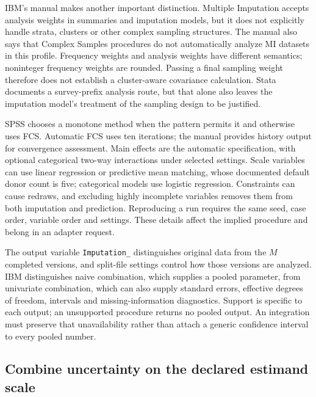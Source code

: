 IBM's manual makes another important distinction. Multiple Imputation accepts
analysis weights in summaries and imputation models, but it does not explicitly
handle strata, clusters or other complex sampling structures. The manual also
says that Complex Samples procedures do not automatically analyze MI datasets
in this profile. Frequency weights and analysis weights have different
semantics; noninteger frequency weights are rounded. Passing a final sampling
weight therefore does not establish a cluster-aware covariance calculation.
Stata documents a survey-prefix analysis route, but that alone also leaves
the imputation model's treatment of the sampling design to be justified.
\cite{exec21_transport_spss_missing,exec21_transport_stata_estimate}

SPSS chooses a monotone method when the pattern permits it and otherwise uses
FCS. Automatic FCS uses ten iterations; the manual provides history output
for convergence assessment. Main effects are the automatic specification,
with optional categorical two-way interactions under selected settings.
Scale variables can use linear regression or predictive mean matching, whose
documented default donor count is five; categorical models use logistic
regression. Constraints can cause redraws, and excluding highly incomplete
variables removes them from both imputation and prediction. Reproducing a run
requires the same seed, case order, variable order and settings. These details
affect the implied procedure and belong in an adapter request.
\cite{exec21_transport_spss_missing}

The output variable \texttt{Imputation\_} distinguishes original data from
the $M$ completed versions, and split-file settings control how those versions
are analyzed. IBM distinguishes naive combination, which supplies a pooled
parameter, from univariate combination, which can also supply standard errors,
effective degrees of freedom, intervals and missing-information diagnostics.
Support is specific to each output; an unsupported procedure returns no pooled
output. An integration must preserve that unavailability rather than attach a
generic confidence interval to every pooled number.
\cite{exec21_transport_spss_missing}

\subsection{Combine uncertainty on the declared estimand scale}
\label{exec21:transport-pooling}

